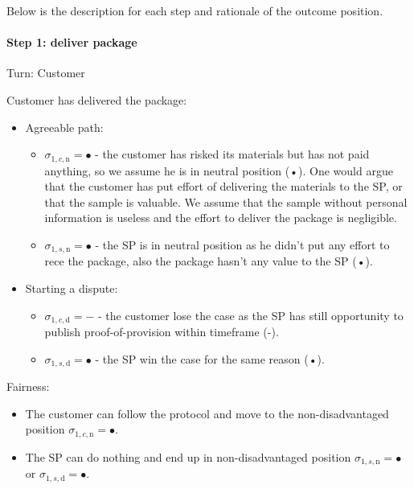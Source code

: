 \documentclass{ieeeaccess}
\begin{document}
Below is the description for each step and rationale of the outcome
position.

\paragraph{Step 1: deliver package}\label{step-1-deliver-package}

Turn: Customer

Customer has delivered the package:

\begin{itemize}
\item
  Agreeable path:

  \begin{itemize}
  
  \item
    \(\sigma_{1, c, \mathrm{n}} = •\) - the customer has risked its
    materials but has not paid anything, so we assume he is in neutral
    position (•). One would argue that the customer has put effort of
    delivering the materials to the SP, or that the sample is valuable.
    We assume that the sample without personal information is useless
    and the effort to deliver the package is negligible.
  \item
    \(\sigma_{1, s, \mathrm{n}} = •\) - the SP is in neutral position as
    he didn't put any effort to rece the package, also the package
    hasn't any value to the SP (•).
  \end{itemize}
\item
  Starting a dispute:

  \begin{itemize}
  
  \item
    \(\sigma_{1, c, \mathrm{d}} = -\) - the customer lose the case as
    the SP has still opportunity to publish proof-of-provision within
    timeframe (-).
  \item
    \(\sigma_{1, s, \mathrm{d}} = •\) - the SP win the case for the same
    reason (•).
  \end{itemize}
\end{itemize}

Fairness:

\begin{itemize}

\item
  The customer can follow the protocol and move to the non-disadvantaged
  position \(\sigma_{1, c, \mathrm{n}} = •\).
\item
  The SP can do nothing and end up in non-disadvantaged position
  \(\sigma_{1, s, \mathrm{n}} = •\) or
  \(\sigma_{1, s, \mathrm{d}} = •\).
\end{itemize}
\end{document}
